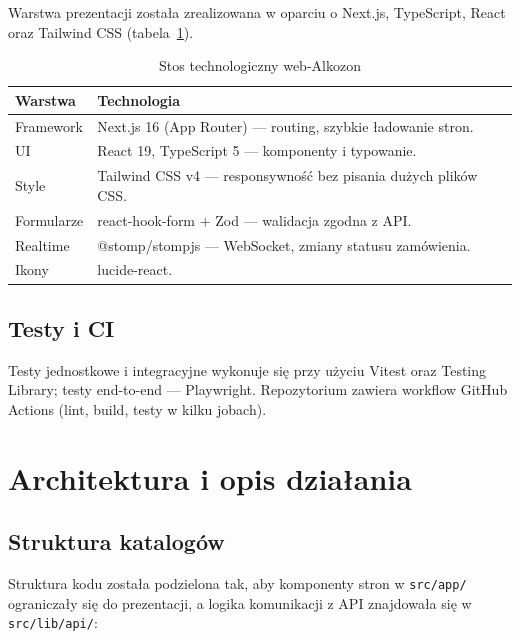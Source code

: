 \documentclass[12pt,a4paper]{report}
\newcommand{\blok}[1]{\needspace{9\baselineskip}#1}
\newcommand{\tabela}[1]{\needspace{11\baselineskip}#1}
\begin{document}
\blok{%
Warstwa prezentacji została zrealizowana w oparciu o Next.js, TypeScript, React oraz Tailwind CSS (tabela~\ref{tab:stack}).
}

\tabela{%
\begin{table}[H]
  \centering
  \caption{Stos technologiczny web-Alkozon}
  \label{tab:stack}
  \begin{tabularx}{\textwidth}{@{}lX@{}}
    \toprule
    \textbf{Warstwa} & \textbf{Technologia} \\
    \midrule
    Framework & Next.js 16 (App Router) --- routing, szybkie ładowanie stron. \\
    UI & React 19, TypeScript 5 --- komponenty i typowanie. \\
    Style & Tailwind CSS v4 --- responsywność bez pisania dużych plików CSS. \\
    Formularze & react-hook-form + Zod --- walidacja zgodna z API. \\
    Realtime & @stomp/stompjs --- WebSocket, zmiany statusu zamówienia. \\
    Ikony & lucide-react. \\
    \bottomrule
  \end{tabularx}
\end{table}
}

\section{Testy i CI}

Testy jednostkowe i integracyjne wykonuje się przy użyciu Vitest oraz Testing Library; testy end-to-end --- Playwright. Repozytorium zawiera workflow GitHub Actions (lint, build, testy w kilku jobach).

\chapter{Architektura i opis działania}

\section{Struktura katalogów}

\blok{%
Struktura kodu została podzielona tak, aby komponenty stron w \texttt{src/app/} ograniczały się do prezentacji, a logika komunikacji z API znajdowała się w \texttt{src/lib/api/}:
}
\end{document}
